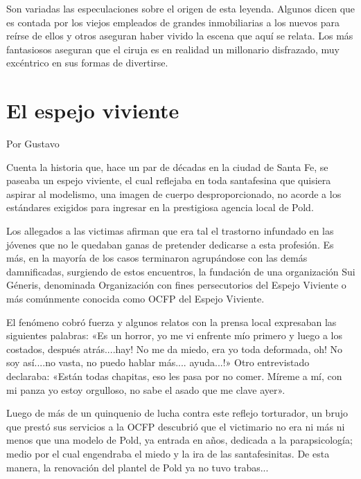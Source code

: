 \documentclass[11pt,twoside,openright,a5paper]{book}
\begin{document}
Son variadas las especulaciones sobre el origen de esta leyenda. Algunos dicen que es contada por los viejos empleados de grandes inmobiliarias a los nuevos para reírse de ellos y otros aseguran haber vivido la escena que aquí se relata. Los más fantasiosos aseguran que el ciruja es en realidad un millonario disfrazado, muy excéntrico en sus formas de divertirse.

\section*{El espejo viviente}

\begin{flushright}Por Gustavo\end{flushright}


Cuenta la historia que, hace un par de décadas en la ciudad de Santa Fe, se paseaba un espejo viviente, el cual reflejaba en toda santafesina que quisiera aspirar al modelismo, una imagen de cuerpo desproporcionado, no acorde a los estándares exigidos para ingresar en la prestigiosa agencia local de Pold.

Los allegados a las victimas afirman que era tal el trastorno infundado en las jóvenes que no le quedaban ganas de pretender dedicarse a esta profesión. Es más, en la mayoría de los casos terminaron agrupándose con las demás damnificadas, surgiendo de estos encuentros, la fundación de una organización Sui Géneris, denominada Organización con fines persecutorios del Espejo Viviente o más comúnmente conocida como OCFP del Espejo Viviente.

El fenómeno cobró fuerza y algunos relatos con la prensa local expresaban las siguientes palabras: «Es un horror, yo me vi enfrente mío primero y luego a los costados, después atrás....hay! No me da miedo, era yo toda deformada, oh! No soy así....no vasta, no puedo hablar más.... ayuda...!» Otro entrevistado declaraba: «Están todas chapitas, eso les pasa por no comer. Míreme a mí, con mi panza yo estoy orgulloso, no sabe el asado que me clave ayer».

Luego de más de un quinquenio de lucha contra este reflejo torturador, un brujo que prestó sus servicios a la OCFP descubrió que el victimario no era ni más ni menos que una modelo de Pold, ya entrada en años, dedicada a la parapsicología; medio por el cual engendraba el miedo y la ira de las santafesinitas. De esta manera, la renovación del plantel de Pold ya no tuvo trabas...
\end{document}
